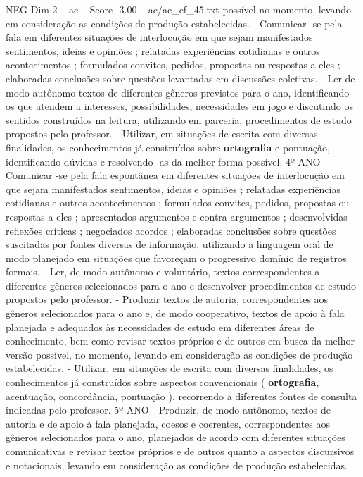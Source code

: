 \begin{textsample}{NEG Dim 2 – ac – Score -3.00 – ac/ac\_ef\_45.txt}
possível no momento, levando em consideração as condições de produção estabelecidas. - Comunicar -se pela fala em diferentes situações de interlocução em que sejam manifestados sentimentos, ideias e opiniões ; relatadas experiências cotidianas e outros acontecimentos ; formulados convites, pedidos, propostas ou respostas a eles ; elaboradas conclusões sobre questões levantadas em discussões coletivas. - Ler de modo autônomo textos de diferentes gêneros previstos para o ano, identificando os que atendem a interesses, possibilidades, necessidades em jogo e discutindo os sentidos construídos na leitura, utilizando em parceria, procedimentos de estudo propostos pelo professor. - Utilizar, em situações de escrita com diversas finalidades, os conhecimentos já construídos sobre \textbf{ortografia} e pontuação, identificando dúvidas e resolvendo -as da melhor forma possível. 4º ANO - Comunicar -se pela fala espontânea em diferentes situações de interlocução em que sejam manifestados sentimentos, ideias e opiniões ; relatadas experiências cotidianas e outros acontecimentos ; formulados convites, pedidos, propostas ou respostas a eles ; apresentados argumentos e contra-argumentos ; desenvolvidas reflexões críticas ; negociados acordos ; elaboradas conclusões sobre questões suscitadas por fontes diversas de informação, utilizando a linguagem oral de modo planejado em situações que favoreçam o progressivo domínio de registros formais. - Ler, de modo autônomo e voluntário, textos correspondentes a diferentes gêneros selecionados para o ano e desenvolver procedimentos de estudo propostos pelo professor. - Produzir textos de autoria, correspondentes aos gêneros selecionados para o ano e, de modo cooperativo, textos de apoio à fala planejada e adequados às necessidades de estudo em diferentes áreas de conhecimento, bem como revisar textos próprios e de outros em busca da melhor versão possível, no momento, levando em consideração as condições de produção estabelecidas. - Utilizar, em situações de escrita com diversas finalidades, os conhecimentos já construídos sobre aspectos convencionais ( \textbf{ortografia}, acentuação, concordância, pontuação ), recorrendo a diferentes fontes de consulta indicadas pelo professor. 5º ANO - Produzir, de modo autônomo, textos de autoria e de apoio à fala planejada, coesos e coerentes, correspondentes aos gêneros selecionados para o ano, planejados de acordo com diferentes situações comunicativas e revisar textos próprios e de outros quanto a aspectos discursivos e notacionais, levando em consideração as condições de produção estabelecidas.

\end{textsample}
